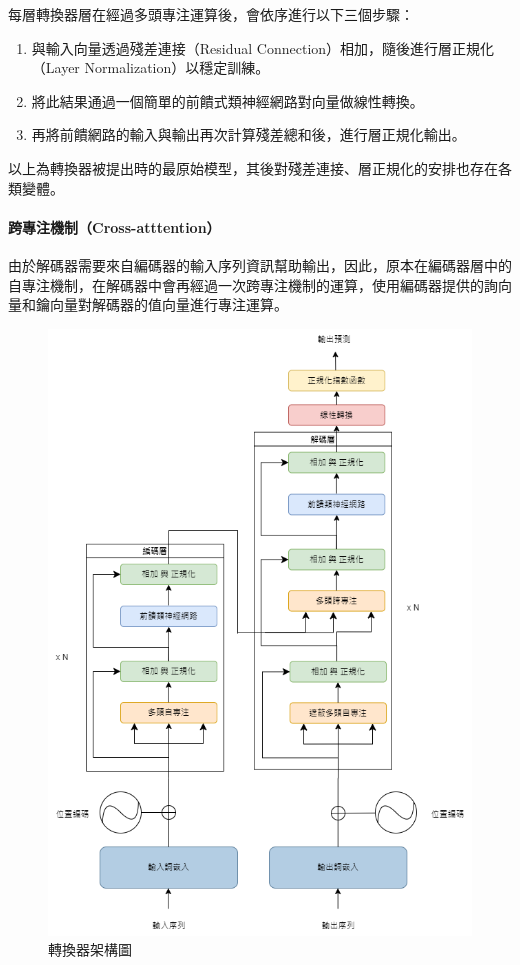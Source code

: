 每層轉換器層在經過多頭專注運算後，會依序進行以下三個步驟：

\begin{enumerate}
    \item 與輸入向量透過殘差連接（Residual Connection）相加，隨後進行層正規化（Layer Normalization）以穩定訓練。
    \item 將此結果通過一個簡單的前饋式類神經網路對向量做線性轉換。
    \item 再將前饋網路的輸入與輸出再次計算殘差總和後，進行層正規化輸出。
\end{enumerate}

以上為轉換器被提出時的最原始模型，其後對殘差連接、層正規化的安排也存在各類變體。

\paragraph{跨專注機制（Cross-atttention）}

由於解碼器需要來自編碼器的輸入序列資訊幫助輸出，因此，原本在編碼器層中的自專注機制，在解碼器中會再經過一次跨專注機制的運算，使用編碼器提供的詢向量和鑰向量對解碼器的值向量進行專注運算。


\begin{figure}
    \centering
    \includegraphics[width=0.9\linewidth]{figures/tfm_arch.drawio.png}
    \caption{轉換器架構圖}
    \label{fig:tfm_arch}
\end{figure}

